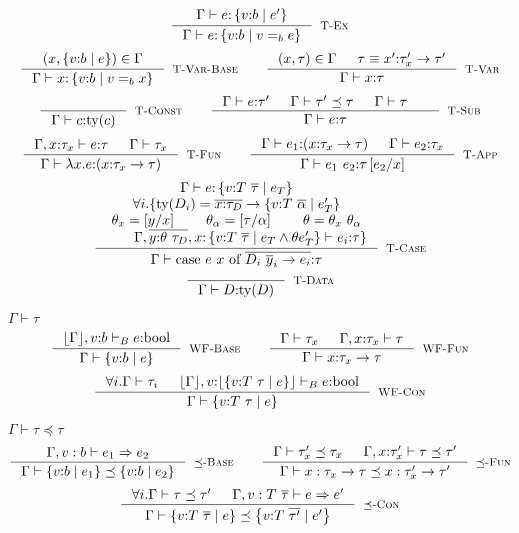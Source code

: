 \documentclass[10pt,a4paper]{article}
\newcommand\rulename[1]{\textsc{#1}\xspace}
\newcommand\rwbase{\rulename{WF-Base}}
\newcommand\rwfun{\rulename{WF-Fun}}
\newcommand\rwcon{\rulename{WF-Con}}
\newcommand\rsubbase{\ensuremath{\preceq}\rulename{-Base}}
\newcommand\rsubfun{\ensuremath{\preceq}\rulename{-Fun}}
\newcommand\rsubcon{\ensuremath{\preceq}\rulename{-Con}}
\newcommand\rtvar{\rulename{T-Var}}
\newcommand\rtvarbase{\rulename{T-Var-Base}}
\newcommand\rtconst{\rulename{T-Const}}
\newcommand\rtsub{\rulename{T-Sub}}
\newcommand\rtexact{\rulename{T-Ex}}
\newcommand\rtcase{\rulename{T-Case}}
\newcommand\rtdata{\rulename{T-Data}}
\newcommand\rtfun{\rulename{T-Fun}}
\newcommand\rtapp{\rulename{T-App}}
\newcommand\efun[2]{\ensuremath{\lambda #1 . #2}}
\newcommand\eapp[2]{\ensuremath{#1 \ #2}}
\newcommand\edata[2]{\ensuremath{#1 \ #2}}
\newcommand\ecase[5]{\ensuremath{\text{case}\ #1\ #2\ \text{of}\ \overline{\edata{#3}{#4} \rightarrow #5}}}
\newcommand\tbool{\ensuremath{\text{bool}}}
\newcommand\tref[3]{\ensuremath{\left\lbrace {#1} \colon {#2} \mid {#3} \right\rbrace}}
\newcommand\tconref[4]{\tref{#3}{\tcon{#1}{#2}}{#4}}
\newcommand\tcon[2]{\ensuremath{#1\ #2}}
\newcommand\tfun[3]{\ensuremath{#1\colon #2 \rightarrow #3}}
\newcommand\eqb[1]{\ensuremath{=_{#1}}}
\newcommand\ty[1]{\ensuremath{\text{ty}({#1})}}
\newcommand\sub[2]{\ensuremath{\left[ #2 / #1 \right]}}
\newcommand\erase[1]{\ensuremath{\lfloor #1 \rfloor}}
\newcommand\hastype[3]{\ensuremath{#1 \vdash #2 \colon #3}}
\newcommand\hastypebase[3]{\ensuremath{#1 \vdash_B #2 \colon #3}}
\newcommand\iswellformed[2]{\ensuremath{#1 \vdash #2}}
\newcommand\issubtype[3]{\ensuremath{#1 \vdash #2 \preceq #3}}
\newcommand\issubref[3]{\ensuremath{#1 \vdash #2 \Rightarrow #3}}
\begin{document}
$$
\inference{
	\hastype{\Gamma}{e}{\tref{v}{b}{e'}}
}{
	\hastype{\Gamma}{e}{\tref{v}{b}{v \eqb{b} e}}
}[\rtexact]
$$
$$
\inference{
	(x,\tref{v}{b}{e}) \in \Gamma
}{
	\hastype{\Gamma}{x}{\tref{v}{b}{v \eqb{b} x}}
}[\rtvarbase]
\qquad
\inference{
	(x,\tau) \in \Gamma &&
	\tau \equiv \tfun{x'}{\tau_x'}{\tau'}
}{
	\hastype{\Gamma}{x}{\tau}
}[\rtvar]
$$
$$
\inference{
}{
	\hastype{\Gamma}{c}{\ty{c}}
}[\rtconst]
\qquad
\inference{
	\hastype{\Gamma}{e}{\tau'} &&
	\issubtype{\Gamma}{\tau'}{\tau} &&
	\iswellformed{\Gamma}{\tau} &&
}{
	\hastype{\Gamma}{e}{\tau}
}[\rtsub]
$$
$$
\inference{
	\hastype{\Gamma, x\colon\tau_x}{e}{\tau} &&
	\iswellformed{\Gamma}{\tau_x}
}{
	\hastype{\Gamma}{\efun{x}{e}}{(\tfun{x}{\tau_x}{\tau})}
}[\rtfun]
\qquad
\inference{
	\hastype{\Gamma}{e_1}{(\tfun{x}{\tau_{x}}{\tau})} &&
	\hastype{\Gamma}{e_2}{\tau_{x}}
}{
	\hastype{\Gamma}{\eapp{e_1}{e_2}}{\tau\sub{x}{e_2}}
}[\rtapp]
$$
$$
\inference{
	\hastype{\Gamma}{e}{\tconref{T}{\overline{\tau}}{v}{e_T}} \\
	\forall i. \{ 
		\ty{D_i} = \overline{x\colon\tau_D}\rightarrow \tconref{T}{\overline{\alpha}}{v}{e'_T} \\
		\theta_x = \sub{x}{y} && \theta_\alpha = \sub{\alpha}{\tau} && \theta = \theta_x\ \theta_\alpha\\
		\qquad \hastype{\Gamma, \overline{y\colon\theta\ \tau_D}, 
						x\colon \tconref{T}{\overline{\tau}}{v}{e_T \land \theta e'_T}
						}{e_i}{\tau}
				\}
}{
	\hastype{\Gamma}{\ecase{e}{x}{D_i}{\overline{y}_i}{e_i}}{\tau}
}[\rtcase]
$$
$$
\inference{
}{
	\hastype{\Gamma}{D}{\ty{D}}
}[\rtdata]
$$


\hfill\mbox{\iswellformed{\Gamma}{\tau}}
$$
\inference{
	\hastypebase{\erase{\Gamma}, v\colon b}{e}{\tbool}
}{
	\iswellformed{\Gamma}{\tref{v}{b}{e}}
}[\rwbase]
\qquad
\inference{
	\iswellformed{\Gamma}{\tau_x} &&
	\iswellformed{\Gamma, x \colon \tau_x}{\tau}
}{
	\iswellformed{\Gamma}{\tfun{x}{\tau_x}{\tau}}
}[\rwfun]
$$
$$
\inference{
	\forall i . \iswellformed{\Gamma}{\tau_i} &&
	\hastypebase{\erase{\Gamma}, v \colon \erase{\tconref{T}{\tau}{v}{e}}}{e}{\tbool}
}{
	\iswellformed{\Gamma}{\tconref{T}{\tau}{v}{e}}
}[\rwcon]
$$

\hfill\mbox{\issubtype{\Gamma}{\tau}{\tau}}
$$
\inference{
	\issubref{\Gamma, v:b}{e_1}{e_2}
}{
	\issubtype{\Gamma}{\tref{v}{b}{e_1}}{\tref{v}{b}{e_2}}
}[\rsubbase]
\qquad
\inference{
	\issubtype{\Gamma}{\tau'_x}{\tau_x} &&
	\issubtype{\Gamma, x \colon \tau'_x}{\tau}{\tau'}
}{
	\issubtype{\Gamma}{x:\tau_x \rightarrow \tau}{x:\tau'_x \rightarrow \tau'}
}[\rsubfun]
$$
$$
\inference{
	\forall i. \issubtype{\Gamma}{\tau}{\tau'} &&
	\issubref{\Gamma, v:\tcon{T}{\overline{\tau}}}{e}{e'}
}{
	\issubtype{\Gamma}
		{\tconref{T}{\overline{\tau}}{v}{e}}
		{\tconref{T}{\overline{\tau'}}{v}{e'}}
}[\rsubcon]
$$
\end{document}
